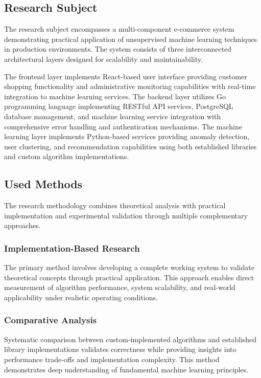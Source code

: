 \documentclass[12pt]{article}
\begin{document}
\subsection{Research Subject}
The research subject encompasses a multi-component e-commerce system demonstrating practical application of unsupervised machine learning techniques in production environments. The system consists of three interconnected architectural layers designed for scalability and maintainability.

The frontend layer implements React-based user interface providing customer shopping functionality and administrative monitoring capabilities with real-time integration to machine learning services. The backend layer utilizes Go programming language implementing RESTful API services, PostgreSQL database management, and machine learning service integration with comprehensive error handling and authentication mechanisms. The machine learning layer implements Python-based services providing anomaly detection, user clustering, and recommendation capabilities using both established libraries and custom algorithm implementations.

\subsection{Used Methods}
The research methodology combines theoretical analysis with practical implementation and experimental validation through multiple complementary approaches.

\subsubsection{Implementation-Based Research}
The primary method involves developing a complete working system to validate theoretical concepts through practical application. This approach enables direct measurement of algorithm performance, system scalability, and real-world applicability under realistic operating conditions.

\subsubsection{Comparative Analysis}
Systematic comparison between custom-implemented algorithms and established library implementations validates correctness while providing insights into performance trade-offs and implementation complexity. This method demonstrates deep understanding of fundamental machine learning principles.
\end{document}
